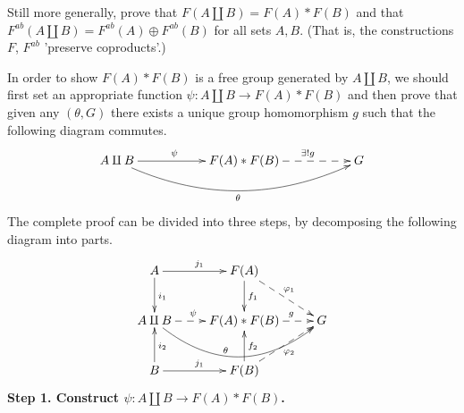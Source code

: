 \documentclass[12pt,letterpaper,boxed]{hmcpset}
\begin{document}
\begin{problem}[5.8]
Still more generally, prove that $F(A\amalg B)=F(A)*F(B)$ and that $F^{ab}(A\amalg B) =F^{ab}(A)\oplus F^{ab}(B)$ for all sets $A, B$. (That is, the constructions $F$, $F^{ab}$ 'preserve coproducts'.)
\end{problem}
\begin{solution}
In order to show $F(A)*F(B)$ is a free group generated by $A\amalg B$, we should first set an appropriate function $\psi:A\amalg B\rightarrow F(A)*F(B)$ and then prove that given any $(\theta,G)$ there exists a unique group homomorphism $g$ such that the following diagram commutes.
	\[\xymatrix{
		A\amalg B\ar[rr]^{\hspace{-1em}\psi}\ar@/_2pc/[rrrr]_{\theta} && F(A)*F(B)\ar@{-->}[rr]^{\hspace{1em}\exists!g}&&G\\
	}\]
The complete proof can be divided into three steps, by decomposing the following diagram into parts.
\[\xymatrix{
	A\ar[r]^{j_1}\ar[d]^{i_1}&F(A)\ar@{-->}[rd]^{\varphi_1}\ar[d]^{f_1}  \\
	A\amalg B\ar@{-->}[r]^{\hspace{-1em}\psi}\ar@/_2.4pc/[rr]^{\hspace{-2em}\theta}&F(A)*F(B)\ar@{-->}[r]^{\hspace{1.3em}g}&G\\	B\ar[r]^{j_1}\ar[u]_{i_2}&F(B)\ar@{-->}[ru]_{\varphi_2}\ar[u]_{f_2}    \\ 
}\]
\noindent\textbf{Step 1. Construct $\psi:A\amalg B\longrightarrow F(A)*F(B)$.} 


\end{solution}
\end{document}

